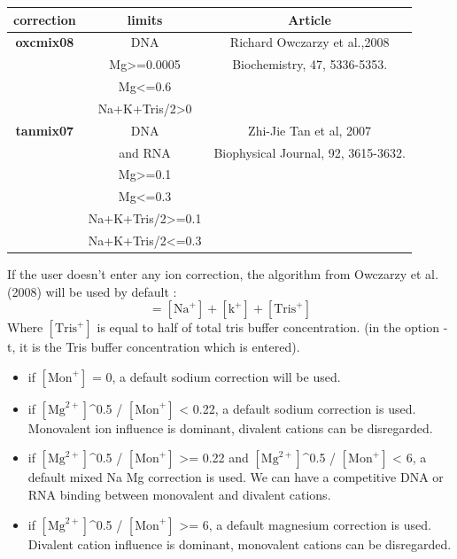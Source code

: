 \documentclass{article}
\begin{document}
\begin{table}[h][c]
\begin{tabular}[h]{| c | c | c |}
\textbf{correction} & \textbf{limits} & \textbf{Article} \\
\hline 
\textbf{oxcmix08} & DNA & Richard Owczarzy et al.,2008 \\
 & Mg>=0.0005 & Biochemistry, 47, 5336-5353. \\
 & Mg<=0.6 & \\
 & Na+K+Tris/2>0 & \\
 \hline
\textbf{tanmix07} & DNA & Zhi-Jie Tan et al, 2007 \\
 & and RNA & Biophysical Journal, 92, 3615-3632.\\
 & Mg>=0.1 & \\
 & Mg<=0.3 & \\
 & Na+K+Tris/2>=0.1 & \\
 & Na+K+Tris/2<=0.3 & \\
 \hline
\end{tabular}
\end{table}

If the user doesn't enter any ion correction, the algorithm from Owczarzy et al. (2008) will
be used by default :
\begin{displaymath}
 [\mbox{Mon}^+] = [\mbox{Na}^+] + [\mbox{k}^+] + [\mbox{Tris}^+]
\end{displaymath}
Where $[\mbox{Tris}^+]$ is equal to half of total tris buffer concentration. (in the option -t, it is the Tris buffer concentration
which is entered).

\begin{itemize}
\item if $[\mbox{Mon}^+]$ = 0, a default sodium correction will be used.
\item if $[\mbox{Mg}^{2+}]$^0.5 / $[\mbox{Mon}^+]$ < 0.22, a default sodium correction is used.
Monovalent ion influence is dominant, divalent cations can be 
disregarded.
\item if $[\mbox{Mg}^{2+}]$^0.5 / $[\mbox{Mon}^+]$ >= 0.22 and $[\mbox{Mg}^{2+}]$^0.5 / $[\mbox{Mon}^+]$ < 6, 
a default mixed Na Mg correction is used.
We can have a competitive DNA or RNA binding between monovalent and divalent 
cations.
\item if $[\mbox{Mg}^{2+}]$^0.5 / $[\mbox{Mon}^+]$ >= 6, a default magnesium correction is used.
Divalent cation influence is dominant, monovalent cations can be 
disregarded.
\end{itemize}
\end{document}
